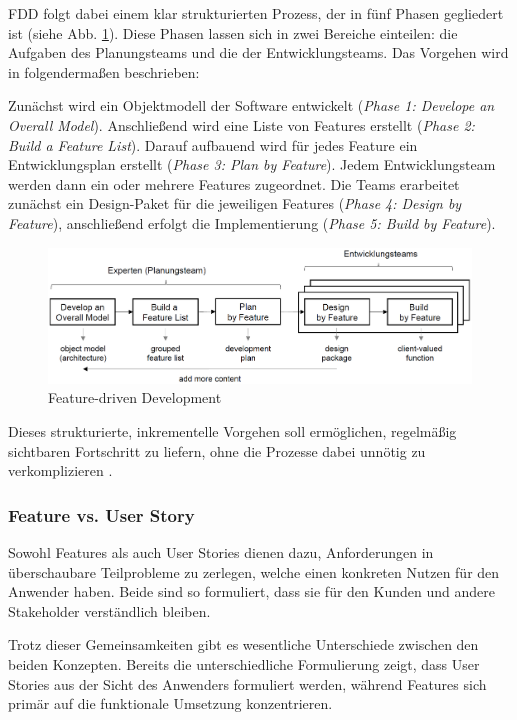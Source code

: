 \documentclass[acmtog]{acmart}
\begin{document}
FDD folgt dabei einem klar strukturierten Prozess, der in fünf Phasen gegliedert ist (siehe Abb. \ref{fig:fdd}). Diese Phasen lassen sich in zwei Bereiche einteilen: die Aufgaben des Planungsteams und die der Entwicklungsteams. Das Vorgehen wird in \cite{coad99} folgendermaßen beschrieben:

Zunächst wird ein Objektmodell der Software entwickelt (\emph{Phase 1: Develope an Overall Model}).
Anschließend wird eine Liste von Features erstellt (\emph{Phase 2: Build a Feature List}).
Darauf aufbauend wird für jedes Feature ein Entwicklungsplan erstellt (\emph{Phase 3: Plan by Feature}).
Jedem Entwicklungsteam werden dann ein oder mehrere Features zugeordnet.
Die Teams erarbeitet zunächst ein Design-Paket für die jeweiligen Features (\emph{Phase 4: Design by Feature}),
anschließend erfolgt die Implementierung (\emph{Phase 5: Build by Feature}).

\begin{figure}[t]
  \centering
  \includegraphics[width=\linewidth]{images/fdd.png}
  \caption{Feature-driven Development}
    \label{fig:fdd}
  \Description{}
\end{figure}

Dieses strukturierte, inkrementelle Vorgehen soll ermöglichen, regelmäßig sichtbaren Fortschritt zu liefern, ohne die Prozesse dabei unnötig zu verkomplizieren \cite{hunt06}.

\subsubsection{Feature vs. User Story}

Sowohl Features als auch User Stories dienen dazu, Anforderungen in überschaubare Teilprobleme zu zerlegen, welche einen konkreten Nutzen für den Anwender haben. Beide sind so formuliert, dass sie für den Kunden und andere Stakeholder verständlich bleiben.

Trotz dieser Gemeinsamkeiten gibt es wesentliche Unterschiede zwischen den beiden Konzepten.
Bereits die unterschiedliche Formulierung zeigt, dass User Stories aus der Sicht des Anwenders formuliert werden, während Features sich primär auf die funktionale Umsetzung konzentrieren.
\end{document}
